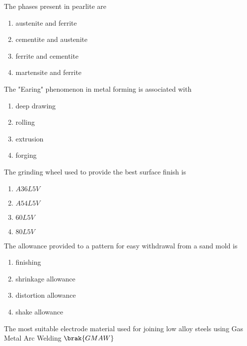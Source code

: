 \item The phases present in pearlite are\\
\begin{enumerate}
    \item austenite and ferrite\\
    \item cementite and austenite\\
    \item ferrite and cementite\\
    \item martensite and ferrite
\end{enumerate}
\item The "Earing" phenomenon in metal forming is associated with\\
\begin{enumerate}
    \item deep drawing\\
    \item rolling\\
    \item extrusion\\
    \item forging
\end{enumerate}
\item The grinding wheel used to provide the best surface finish is\\
\begin{enumerate}
   \item $A36L5V$\\
    \item $A54L5V$\\
    \item $60L5V$\\
   \item $80L5V$
\end{enumerate}
\item The allowance provided to a pattern for easy withdrawal from a sand mold is\\
\begin{enumerate}
    \item finishing\\
    \item shrinkage allowance\\
    \item distortion allowance\\
    \item shake allowance   
\end{enumerate}
   \item The most suitable electrode material used for joining low alloy steels using Gas Metal Arc Welding $\brak{GMAW}$\\
